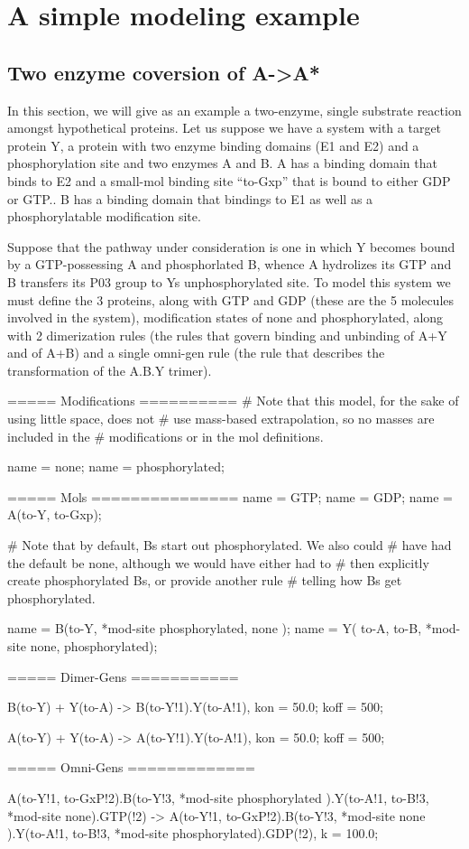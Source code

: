 \section{A simple modeling example}

\subsection{Two enzyme coversion of A->A*}
In this section, we will give as an example a two-enzyme, single
substrate reaction amongst hypothetical proteins.  Let us suppose we
have a system with a target protein Y, a protein with two enzyme
binding domains (E1 and E2) and a phosphorylation site and two enzymes
A and B.  A has a binding domain that binds to E2 and a small-mol
binding site ``to-Gxp'' that is bound to either GDP or GTP..  B has a
binding domain that bindings to E1 as well as a phosphorylatable
modification site.  

Suppose that the pathway under consideration is one in
which Y becomes bound by a GTP-possessing A and phosphorlated B,
whence A hydrolizes its GTP and B transfers its P03 group to Ys
unphosphorylated site.  To model this system we must define the 3
proteins, along with GTP and GDP (these are the 5 molecules involved
in the system), modification states of none and phosphorylated, along
with 2 dimerization rules (the rules that govern binding and unbinding
of A+Y and of A+B) and a single omni-gen rule (the rule that describes
the transformation of the A.B.Y trimer).

\begin{ExampleMZR}
===== Modifications ==========
# Note that this model, for the sake of using little space, does not
# use mass-based extrapolation, so no masses are included in the
# modifications or in the mol definitions.

name = none;
name = phosphorylated;


===== Mols ===============
name = GTP;
name = GDP;
name = A(to-Y, to-Gxp);

# Note that by default, Bs start out phosphorylated.  We also could
# have had the default be none, although we would have either had to
# then explicitly create phosphorylated Bs, or provide another rule
# telling how Bs get phosphorylated.

name = B(to-Y, *mod-site {phosphorylated, none} );
name = Y( to-A, to-B, *mod-site {none, phosphorylated});

===== Dimer-Gens ===========

B(to-Y) + Y(to-A) -> B(to-Y!1).Y(to-A!1),
   kon = 50.0;
   koff = 500;

A(to-Y) + Y(to-A) -> A(to-Y!1).Y(to-A!1),
   kon = 50.0;
   koff = 500;

===== Omni-Gens =============

A(to-Y!1, to-GxP!2).B(to-Y!3, *mod-site {phosphorylated} ).Y(to-A!1, to-B!3, *mod-site {none}).GTP(!2) ->
  A(to-Y!1, to-GxP!2).B(to-Y!3, *mod-site {none} ).Y(to-A!1, to-B!3, *mod-site {phosphorylated}).GDP(!2),
  k = 100.0;


\end{ExampleMZR}


